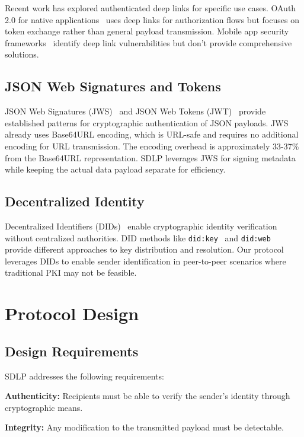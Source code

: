 \documentclass[conference]{IEEEtran}
\begin{document}
Recent work has explored authenticated deep links for specific use cases. OAuth 2.0 for native applications~\cite{rfc8252} uses deep links for authorization flows but focuses on token exchange rather than general payload transmission. Mobile app security frameworks~\cite{mobile-app-security} identify deep link vulnerabilities but don't provide comprehensive solutions.

\subsection{JSON Web Signatures and Tokens}

JSON Web Signatures (JWS)~\cite{rfc7515} and JSON Web Tokens (JWT)~\cite{rfc7519} provide established patterns for cryptographic authentication of JSON payloads. JWS already uses Base64URL encoding, which is URL-safe and requires no additional encoding for URL transmission. The encoding overhead is approximately 33-37\% from the Base64URL representation. SDLP leverages JWS for signing metadata while keeping the actual data payload separate for efficiency.

\subsection{Decentralized Identity}

Decentralized Identifiers (DIDs)~\cite{w3c-did-core} enable cryptographic identity verification without centralized authorities. DID methods like \texttt{did:key}~\cite{did-key-spec} and \texttt{did:web}~\cite{did-web-spec} provide different approaches to key distribution and resolution. Our protocol leverages DIDs to enable sender identification in peer-to-peer scenarios where traditional PKI may not be feasible.

\section{Protocol Design}

\subsection{Design Requirements}

SDLP addresses the following requirements:

\textbf{Authenticity:} Recipients must be able to verify the sender's identity through cryptographic means.

\textbf{Integrity:} Any modification to the transmitted payload must be detectable.
\end{document}
